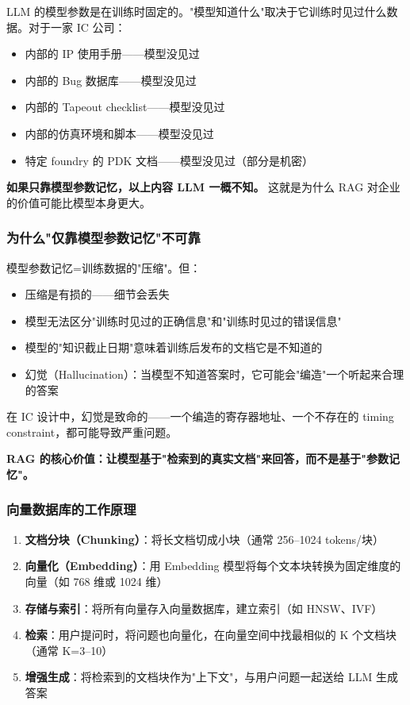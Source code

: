 \documentclass[UTF8,a4paper,10pt,oneside]{ctexart}
\begin{document}
LLM 的模型参数是在训练时固定的。"模型知道什么"取决于它训练时见过什么数据。对于一家 IC 公司：

\begin{itemize}
    \item 内部的 IP 使用手册——模型没见过
    \item 内部的 Bug 数据库——模型没见过
    \item 内部的 Tapeout checklist——模型没见过
    \item 内部的仿真环境和脚本——模型没见过
    \item 特定 foundry 的 PDK 文档——模型没见过（部分是机密）
\end{itemize}

\textbf{如果只靠模型参数记忆，以上内容 LLM 一概不知。} 这就是为什么 RAG 对企业的价值可能比模型本身更大。

\subsubsection{为什么"仅靠模型参数记忆"不可靠}

模型参数记忆=训练数据的"压缩"。但：
\begin{itemize}
    \item 压缩是有损的——细节会丢失
    \item 模型无法区分"训练时见过的正确信息"和"训练时见过的错误信息"
    \item 模型的"知识截止日期"意味着训练后发布的文档它是不知道的
    \item 幻觉（Hallucination）：当模型不知道答案时，它可能会"编造"一个听起来合理的答案
\end{itemize}

在 IC 设计中，幻觉是致命的——一个编造的寄存器地址、一个不存在的 timing constraint，都可能导致严重问题。

\textbf{RAG 的核心价值：让模型基于"检索到的真实文档"来回答，而不是基于"参数记忆"。}

\subsubsection{向量数据库的工作原理}

\begin{enumerate}
    \item \textbf{文档分块（Chunking）}：将长文档切成小块（通常 256--1024 tokens/块）
    \item \textbf{向量化（Embedding）}：用 Embedding 模型将每个文本块转换为固定维度的向量（如 768 维或 1024 维）
    \item \textbf{存储与索引}：将所有向量存入向量数据库，建立索引（如 HNSW、IVF）
    \item \textbf{检索}：用户提问时，将问题也向量化，在向量空间中找最相似的 K 个文档块（通常 K=3--10）
    \item \textbf{增强生成}：将检索到的文档块作为"上下文"，与用户问题一起送给 LLM 生成答案
\end{enumerate}
\end{document}
